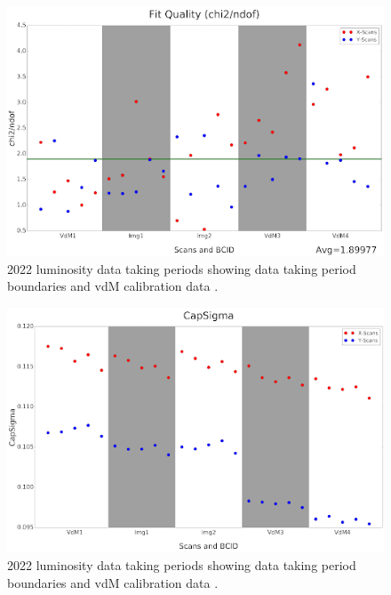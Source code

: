 \begin{figure}[!htp]
\centering
\includegraphics[width=1\textwidth]{ashish_thesis/2022_vdM_fit_quality-png.png}
\caption[2018 CMS luminosity data taking periods.]{%
  2022 luminosity data taking periods showing data taking period boundaries and vdM calibration data  \cite{CERNLumiPublicResults}.
}
\label{fig:period_bound}
\end{figure}



\begin{figure}[!htp]
\centering
\includegraphics[width=1\textwidth]{ashish_thesis/2022_capsigma.png}
\caption[2018 CMS luminosity data taking periods.]{%
  2022 luminosity data taking periods showing data taking period boundaries and vdM calibration data  \cite{CERNLumiPublicResults}.
}
\label{fig:period_bound}
\end{figure}






